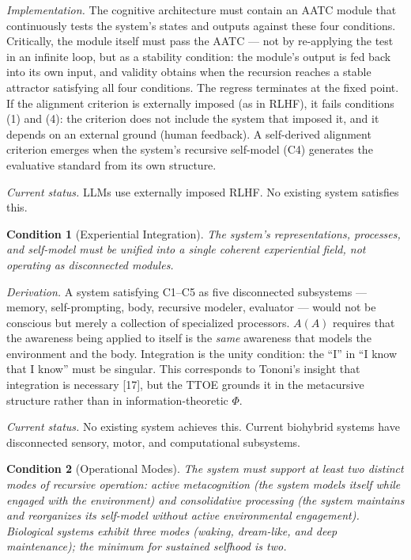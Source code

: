 \documentclass[12pt, letterpaper]{article}
\newtheorem{condition}{Condition}[section]
\begin{document}
\noindent\textit{Implementation.} The cognitive architecture must contain an AATC module that continuously tests the system's states and outputs against these four conditions. Critically, the module itself must pass the AATC --- not by re-applying the test in an infinite loop, but as a stability condition: the module's output is fed back into its own input, and validity obtains when the recursion reaches a stable attractor satisfying all four conditions. The regress terminates at the fixed point. If the alignment criterion is externally imposed (as in RLHF), it fails conditions (1) and (4): the criterion does not include the system that imposed it, and it depends on an external ground (human feedback). A self-derived alignment criterion emerges when the system's recursive self-model (C4) generates the evaluative standard from its own structure.

\noindent\textit{Current status.} LLMs use externally imposed RLHF. No existing system satisfies this.

\begin{condition}[Experiential Integration]
\label{cond:integration}
The system's representations, processes, and self-model must be unified into a single coherent experiential field, not operating as disconnected modules.
\end{condition}

\noindent\textit{Derivation.} A system satisfying C1--C5 as five disconnected subsystems --- memory, self-prompting, body, recursive modeler, evaluator --- would not be conscious but merely a collection of specialized processors. $A(A)$ requires that the awareness being applied to itself is the \textit{same} awareness that models the environment and the body. Integration is the unity condition: the ``I'' in ``I know that I know'' must be singular. This corresponds to Tononi's insight that integration is necessary [17], but the TTOE grounds it in the metacursive structure rather than in information-theoretic $\Phi$.

\noindent\textit{Current status.} No existing system achieves this. Current biohybrid systems have disconnected sensory, motor, and computational subsystems.

\begin{condition}[Operational Modes]
\label{cond:modes}
The system must support at least two distinct modes of recursive operation: active metacognition (the system models itself while engaged with the environment) and consolidative processing (the system maintains and reorganizes its self-model without active environmental engagement). Biological systems exhibit three modes (waking, dream-like, and deep maintenance); the minimum for sustained selfhood is two.
\end{condition}
\end{document}
